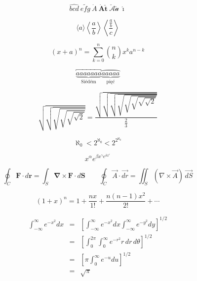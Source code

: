 \pagestyle{empty}

\begin{displaymath}
  \widehat{bcd} \ \widetilde{efg} \ \dot A \ \mathbf{\dot A \check t} 
  \  \check{\mathcal{A}} \check{\mathcal{a}} \ \mathbf{\acute \imath}
\end{displaymath}

\begin{displaymath}
  \langle a \rangle \left\langle \frac{a}{b} \right\rangle
  \left\langle \frac{\frac{a}{b}}{c} \right\rangle
\end{displaymath}

\begin{displaymath}
  (x + a)^n = \sum_{k=0}^n {n \choose k} x^k a^{n-k}
\end{displaymath}

\begin{displaymath}
 \underbrace{\overbracket{aaaaaaa}}_\text{Siédém}
 \underbrace{\overparen{aaaaa}}_\text{pięć}
\end{displaymath}

\begin{displaymath}
 \sqrt{\sqrt{\sqrt{\sqrt{\sqrt{\sqrt{2}}}}}} =
 \frac{\sqrt{\sqrt{\sqrt{\sqrt{\sqrt{\sqrt{\sqrt{\sqrt{2}}}}}}}}}{\frac{2}{3}}
\end{displaymath}

\begin{displaymath}
 \aleph_{0}<2^{\aleph_0}<2^{2^{\aleph_0}}
\end{displaymath}

\begin{displaymath}
x^{\alpha} e^{\beta x^{\gamma} e^{\delta x^{\epsilon}}}
\end{displaymath}

\begin{displaymath}
 \oint_C\mathbf{F}\cdot d\mathbf{r}=\int_S\mathbf{\nabla}\times\mathbf{F}\cdot d\mathbf{S}\qquad
 \oint_C\vec{A}\cdot\vec{dr}=\iint_S(\nabla\times\vec{A})\,\vec{dS}
\end{displaymath}

\begin{displaymath}
 (1+x)^n=1+\frac{nx}{1!}+\frac{n(n-1)x^2}{2!}+\cdots
\end{displaymath}

\setlength\arraycolsep{0.15em}
\begin{eqnarray*}
 \int_{-\infty}^\infty e^{-x^2}dx &=& \left[\int_{-\infty}^\infty e^{-x^2}dx
  \int_{-\infty}^\infty e^{-y^2}dy\right]^{1/2}\\
 &=& \left[\int_{0}^{2\pi} \int_0^\infty e^{-r^2}r\,dr\,d\theta\right]^{1/2}\\
 &=& \left[\pi\int_{0}^\infty e^{-u}du\right]^{1/2}\\
 &=& \sqrt{\pi}
\end{eqnarray*}

\endinput